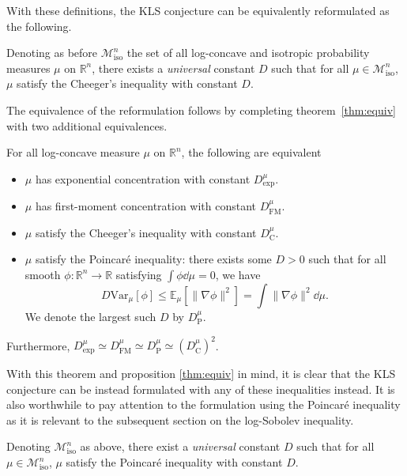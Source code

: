 With these definitions, the KLS conjecture can be equivalently reformulated as the following.

\begin{conjecture}
  Denoting as before \(\mathscr{M}^n_{\text{iso}}\) the set of all log-concave and isotropic probability measures \(\mu\) on 
  \(\mathbb{R}^n\), there exists a \textit{universal} constant \(D\) such that for all 
  \(\mu \in \mathscr{M}^n_{\text{iso}}\), \(\mu\) satisfy the Cheeger's inequality with constant \(D\).
\end{conjecture}

The equivalence of the reformulation follows by completing theorem~\ref{thm:equiv} with two additional 
equivalences.

\begin{theorem}\label{thm:milman2}
  For all log-concave measure \(\mu\) on \(\mathbb{R}^n\), the following are equivalent
  \begin{itemize}
    \item \(\mu\) has exponential concentration with constant \(D^\mu_\text{exp}\).
    \item \(\mu\) has first-moment concentration with constant \(D^\mu_\text{FM}\).
    \item \(\mu\) satisfy the Cheeger's inequality with constant \(D^\mu_\text{C}\).
    \item \(\mu\) satisfy the Poincaré inequality: there exists some \(D > 0\) such that for all 
      smooth \(\phi : \mathbb{R}^n \to \mathbb{R}\) satisfying \(\int \phi \dd\mu = 0\), we have
      \[D \text{Var}_\mu[\phi] \le \mathbb{E}_\mu[\|\nabla \phi\|^2] = \int \|\nabla \phi\|^2 \dd\mu.\]
      We denote the largest such \(D\) by \(D^\mu_{\text{P}}\).
  \end{itemize}
  Furthermore, \(D^\mu_{\text{exp}} \simeq D^\mu_{\text{FM}} \simeq D^\mu_{\text{P}} \simeq (D^\mu_{\text{C}})^2\).
\end{theorem}

With this theorem and proposition \ref{thm:equiv} in mind, it is clear that the KLS conjecture can be 
instead formulated with any of these inequalities instead. It is also worthwhile to pay attention to the 
formulation using the Poincaré inequality as it is relevant to the subsequent section on the log-Sobolev 
inequality.

\begin{conjecture}
  Denoting \(\mathscr{M}^n_{\text{iso}}\) as above, there exist a \textit{universal} constant \(D\) 
  such that for all \(\mu \in \mathscr{M}^n_{\text{iso}}\), \(\mu\) satisfy the Poincaré inequality 
  with constant \(D\).
\end{conjecture}


